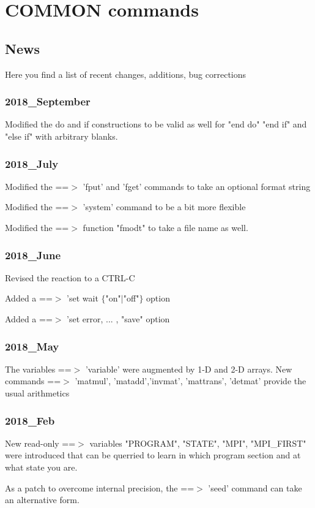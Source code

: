 \chapter{COMMON commands}
\section{News}
\par
Here you find a list of recent changes, additions, bug corrections 
\subsection*{2018\_September}
\par
Modified the do and if constructions to be valid as well for 
"end do" "end if" and "else if" with arbitrary blanks. 
\subsection*{2018\_July}
\par
Modified the ==$> $ 'fput' and 'fget' commands to take an optional 
    format string 
\par
Modified the ==$> $ 'system' command to be a bit more flexible 
\par
Modified the ==$> $ function "fmodt" to take a file name as well. 
\subsection*{2018\_June}
\par
Revised the reaction to a CTRL-C 
\par
Added a ==$> $ 'set wait $ \{$"on"$| $"off"$\} $ option 
\par
Added a ==$> $ 'set error, ... , "save" option 
\subsection*{2018\_May}
\par
The variables ==$> $ 'variable' were augmented by 1-D and 2-D arrays. 
New commands ==$> $ 'matmul', 'matadd','invmat', 'mattrans', 
'detmat' provide the usual arithmetics 
\subsection*{2018\_Feb}
\par
New read-only ==$> $ variables "PROGRAM", "STATE", "MPI", "MPI\_FIRST" 
were introduced that can be querried to learn in which program 
section and at what state you are. 
\par
As a patch to overcome internal precision, the ==$> $ 'seed' command 
can take an alternative form. 
